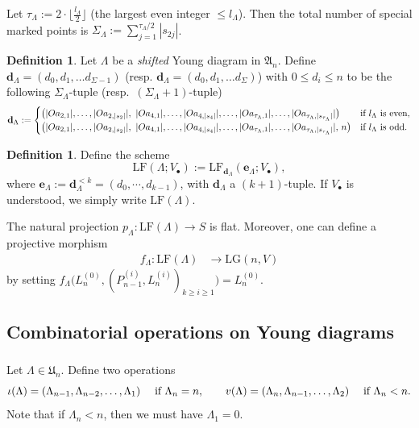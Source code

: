 \documentclass[a4paper]{amsart}
\theoremstyle{plain}
\theoremstyle{definition}
\newtheorem{definition}[theorem]{Definition}
\numberwithin{equation}{section}
\newcommand{\LG}{\mathrm{LG}}
\begin{document}
Let $\tau_{\Lambda}:= 2 \cdot \big\lfloor \tfrac{l_\Lambda}{2} \big\rfloor$ (the largest even integer $\le l_\Lambda$). Then the total number of special marked points is $\Sigma_\Lambda:= \sum_{j=1}^{\tau_\Lambda/2} |s_{2j}|$.

\begin{definition}\label{def:d-lambda}
    Let $\Lambda$ be a \textit{shifted} Young diagram in $\mathfrak{A}_n$. Define
    $\mathbf{{d}}_{\Lambda} = (d_0, d_1, \ldots d_{\Sigma-1})$ (resp. $\mathbf{{d}}_{\Lambda} = (d_0, d_1, \ldots d_\Sigma)$) with $0 \leq d_i \leq n$
    to be the following $\Sigma_\Lambda$-tuple (resp.\ $(\Sigma_\Lambda + 1)$-tuple)
    \[
        \mathbf{d}_\Lambda:=
        \begin{cases}
            \big(|Oa_{2,1}|,\ldots, |Oa_{2,|s_2|}|,\ |Oa_{4,1}|,\ldots, |Oa_{4,|s_4|}|, \ldots, |Oa_{\tau_\Lambda,1}|,\ldots, |Oa_{\tau_\Lambda,|s_{\tau_\Lambda}|}|\big)       & \textnormal{if $l_\Lambda$ is even}, \\
            \big(|Oa_{2,1}|,\ldots, |Oa_{2,|s_2|}|,\ |Oa_{4,1}|,\ldots, |Oa_{4,|s_4|}|, \ldots, |Oa_{\tau_\Lambda,1}|,\ldots, |Oa_{\tau_\Lambda,|s_{\tau_\Lambda}|}|,\, n \big) & \textnormal{if $l_\Lambda$ is odd}.
        \end{cases}
    \]
\end{definition}

\begin{definition}
    Define the scheme
    \[
        \mathrm{LF}(\Lambda; {V}_\bullet):=\mathrm{LF}_{\mathbf{{d}}_{\Lambda}}(\mathbf{e}_{\Lambda}; {V}_\bullet),		\]
    where $\mathbf{e}_{\Lambda} := \mathbf{d}^{<k}_\Lambda = (d_0, \cdots, d_{k-1})$, with $\mathbf{d}_\Lambda$ a $(k+1)$-tuple. If ${V}_\bullet$ is understood, we simply write $\mathrm{LF}({\Lambda})$.
\end{definition}

The natural projection $p_\Lambda: \mathrm{LF}({\Lambda}) \to S$ is flat. Moreover, one can define a projective morphism
\begin{align*}
    f_\Lambda: \mathrm{LF}({\Lambda}) & \to \LG(n,V)
\end{align*}
by setting $f_\Lambda\big( L_n^{(0)}, (P_{n-1}^{(i)},L_n^{(i)})_{k \geq i \geq 1} \big) = L_n^{(0)} $.

\subsection{Combinatorial operations on Young diagrams}
\subsubsection{ }
Let $\Lambda \in \mathfrak{U}_n$. Define two operations
\[
    {\iota}(\Lambda) = (\Lambda_{n-1}, \Lambda_{n-2}, \ldots, \Lambda_1) \quad \textnormal{ if $\Lambda_n = n$}, \quad \quad
    v(\Lambda) = (\Lambda_{n}, \Lambda_{n-1}, \ldots, \Lambda_2) \quad  \textnormal{ if $\Lambda_n < n$}.
\]
Note that if $\Lambda_n < n$, then we must have $\Lambda_1=0$.
\end{document}
